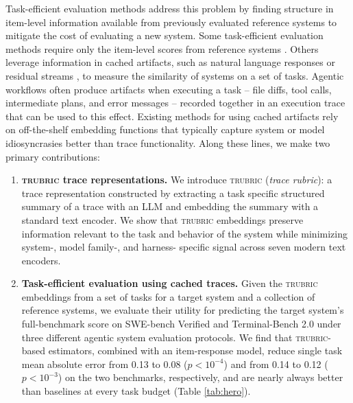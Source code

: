 \documentclass{article}
\newcommand{\trubric}{\textsc{trubric}}
\begin{document}
Task-efficient evaluation methods address this problem by finding structure in item-level information available from previously evaluated reference systems to mitigate the cost of evaluating a new system.
Some task-efficient evaluation methods require only the item-level scores from reference systems \citep{maiapolo2024tinybenchmarks,vivek2024anchor, kipnis2025metabench, bowyer2026efficient}.
Others leverage information in cached artifacts, such as natural language responses \citep{acharyya2024consistent,helm2025statistical} or residual streams \citep{duderstadt2023data}, to measure the similarity of systems on a set of tasks.
Agentic workflows often produce artifacts when executing a task -- file diffs, tool calls, intermediate plans, and error messages -- recorded together in an execution trace that can be used to this effect.
Existing methods for using cached artifacts rely on off-the-shelf embedding functions that typically capture system or model idiosyncrasies \citep{sun2025idiosyncrasies} better than trace functionality.
Along these lines, we make two primary contributions:
\begin{enumerate}
[wide, labelwidth=1pt, labelindent=12pt]
\setlength{\itemsep}{1pt}\setlength{\parskip}{0pt}
    \item \textbf{\trubric{} trace representations.} We introduce \trubric{} (\emph{trace rubric}): a trace representation constructed by extracting a task specific structured summary of a trace with an LLM and embedding the summary with a standard text encoder.
    We show that \trubric{} embeddings preserve information relevant to the task and behavior of the system while minimizing system-, model family-, and harness- specific signal across seven modern text encoders.
    \item \textbf{Task-efficient evaluation using cached traces.} Given the \trubric{} embeddings from a set of tasks for a target system and a collection of reference systems, we evaluate their utility for predicting the target system's full-benchmark score on SWE-bench Verified and Terminal-Bench 2.0 under three different agentic system evaluation protocols.
    We find that \trubric{}-based estimators, combined with an item-response model, reduce single task mean absolute error from 0.13 to 0.08 ($p < 10^{-4}$) and from 0.14 to 0.12 ($p < 10^{-3}$) on the two benchmarks, respectively, and are nearly always better than baselines at every task budget (Table \ref{tab:hero}).
\end{enumerate}
\end{document}
